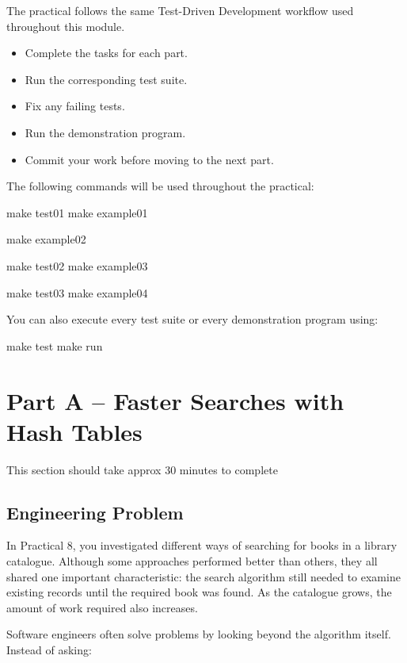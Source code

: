 \documentclass{csc2059practical}
\begin{document}
The practical follows the same Test-Driven Development workflow used throughout this module.

\begin{itemize}
    \item Complete the tasks for each part.
    \item Run the corresponding test suite.
    \item Fix any failing tests.
    \item Run the demonstration program.
    \item Commit your work before moving to the next part.
\end{itemize}

The following commands will be used throughout the practical:

\begin{terminal}
make test01
make example01

make example02

make test02
make example03

make test03
make example04
\end{terminal}

You can also execute every test suite or every demonstration program using:

\begin{terminal}
make test
make run
\end{terminal}

\section{Part A -- Faster Searches with Hash Tables}
\begin{infobox}
    This section should take approx 30 minutes to complete
\end{infobox}

\subsection*{Engineering Problem}

In Practical 8, you investigated different ways of searching for books in a library catalogue. Although some approaches performed better than others, they all shared one important characteristic: the search algorithm still needed to examine existing records until the required book was found. As the catalogue grows, the amount of work required also increases.

Software engineers often solve problems by looking beyond the algorithm itself. Instead of asking:
\end{document}
